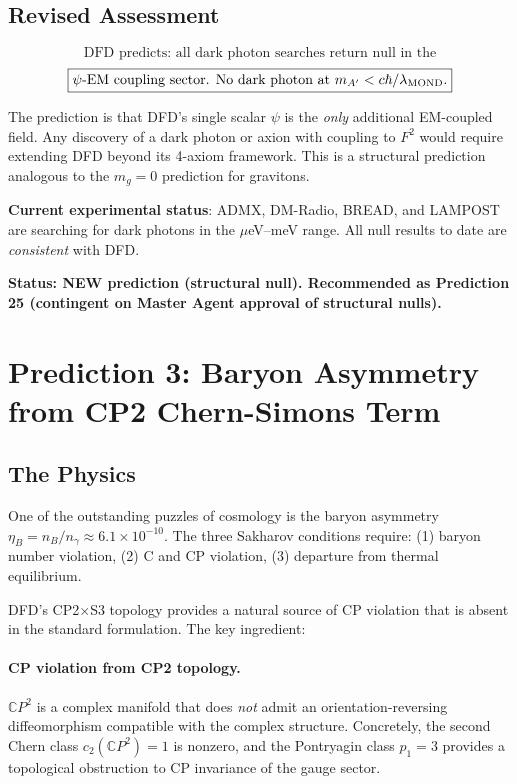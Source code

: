 \documentclass[11pt]{article}
\begin{document}
\subsection{Revised Assessment}

\begin{equation}
\boxed{
\text{DFD predicts: all dark photon searches return null in the}
}
\end{equation}
\begin{equation}
\boxed{
\text{$\psi$-EM coupling sector.  No dark photon at $m_{A'} < c\hbar/\lambda_{\rm MOND}$.}
}
\end{equation}

The prediction is that DFD's single scalar $\psi$ is the \emph{only}
additional EM-coupled field.  Any discovery of a dark photon or axion
with coupling to $F^2$ would require extending DFD beyond its 4-axiom
framework.  This is a structural prediction analogous to the $m_g = 0$
prediction for gravitons.

\textbf{Current experimental status}: ADMX, DM-Radio, BREAD, and
LAMPOST are searching for dark photons in the $\mu$eV--meV range.
All null results to date are \emph{consistent} with DFD.

\textbf{Status: NEW prediction (structural null).  Recommended as
Prediction 25 (contingent on Master Agent approval of structural nulls).}

\section{Prediction 3: Baryon Asymmetry from CP2 Chern-Simons Term}
\label{sec:baryon-asymmetry}

\subsection{The Physics}

One of the outstanding puzzles of cosmology is the baryon asymmetry
$\eta_B = n_B/n_\gamma \approx 6.1 \times 10^{-10}$.  The three
Sakharov conditions require: (1) baryon number violation, (2) C and CP
violation, (3) departure from thermal equilibrium.

DFD's CP2$\times$S3 topology provides a natural source of CP violation
that is absent in the standard formulation.  The key ingredient:

\paragraph{CP violation from CP2 topology.}
$\mathbb{C}P^2$ is a complex manifold that does \emph{not} admit an
orientation-reversing diffeomorphism compatible with the complex
structure.  Concretely, the second Chern class $c_2(\mathbb{C}P^2) = 1$
is nonzero, and the Pontryagin class $p_1 = 3$ provides a topological
obstruction to CP invariance of the gauge sector.
\end{document}
